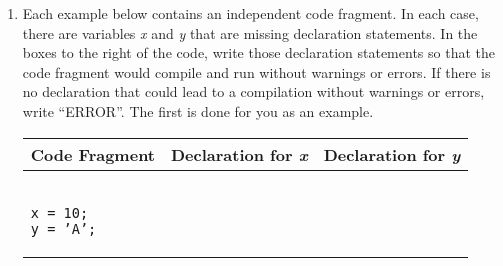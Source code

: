 \documentclass[11pt]{article}
\begin{document}
\begin{enumerate}
\begin{enumerate}
\begin{Verbatim}
p = malloc(sizeof(int));
*p = b;
q = &c;
p = &a;     (M, since p now has address of a, malloc'd memory has no pointer to it)
*q = b;
q = malloc(sizeof(10));
*r = a + b + c;		(P)
free(p);	(H, p points to a)
r = q;
p = malloc(sizeof(int));
*p = *r;
free(q);
free(r);	(D, r and q point to same thing)
free(p);
		\end{Verbatim}

	\vspace{1cm}
	\item What does the following piece of code print?
	\begin{Verbatim}
struct Point {
	int x;
	int y;
};

struct Point p1, p2;
struct Point *q1, *q2;

p1.x = 5;  p1.y = 10;
p2.x = 1;  p2.y = 10;

q1 = &p2;
q2 = &p1;
q1->x += 2;    q1->y += 7;
q2->x += 4;    q2->y += 3;

printf("P1(X,Y) = (%d, %d)\n", p1.x, p1.y);
printf("P2(X,Y) = (%d, %d)\n", p2.x, p2.y);
	\end{Verbatim}
	\begin{tcolorbox}\begin{Verbatim}
P1(X,Y) = (9, 13)
P2(X,Y) = (3, 17)
	\end{Verbatim}
\end{tcolorbox}
	\end{enumerate}

	\newpage
	\item Each example below contains an independent code fragment. In each case, there are variables \textit{x} and \textit{y} that are missing declaration statements. In the boxes to the right of the code, write those declaration statements so that the code fragment would compile and run without warnings or errors. If there is no declaration that could lead to a compilation without warnings or errors, write “ERROR”. The first is done for you as an example.\\
		\begin{tabular}[c]{| l | l | l |}
			\hline
			\textbf{Code Fragment} & \textbf{Declaration for \textit{x}} & \textbf{Declaration for \textit{y}}\\
			\hline
			\begin{minipage}{0.3\textwidth}
				\begin{Verbatim}

x = 10;
y = ’A’;

			\end{Verbatim}
			\end{minipage} &
			\begin{minipage}{0.3\textwidth}
				\begin{Verbatim}


\end{Verbatim}
\end{minipage}
\end{tabular}
\end{enumerate}
\end{document}
